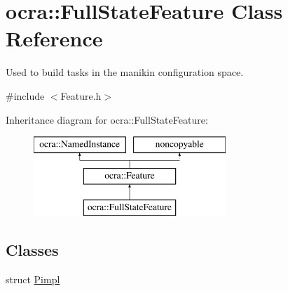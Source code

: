 \hypertarget{classocra_1_1FullStateFeature}{}\section{ocra\+:\+:Full\+State\+Feature Class Reference}
\label{classocra_1_1FullStateFeature}


Used to build tasks in the manikin configuration space.  




{\ttfamily \#include $<$Feature.\+h$>$}

Inheritance diagram for ocra\+:\+:Full\+State\+Feature\+:\begin{figure}[H]
\begin{center}
\leavevmode
\includegraphics[height=3.000000cm]{d4/d65/classocra_1_1FullStateFeature}
\end{center}
\end{figure}
\subsection*{Classes}
\begin{DoxyCompactItemize}
\item 
struct \hyperlink{structocra_1_1FullStateFeature_1_1Pimpl}{Pimpl}
\end{DoxyCompactItemize}
